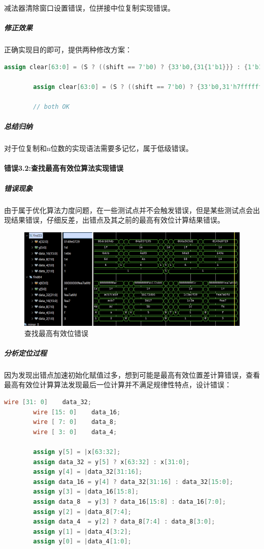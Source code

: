 \documentclass[UTF-8,twoside,c5size]{ctexart}
\begin{document}
	减法器清除窗口设置错误，位拼接中位复制实现错误。
	
	\subparagraph{修正效果}\hfill
	
	正确实现目的即可，提供两种修改方案：
	
	\begin{lstlisting}[language=verilog]
		assign clear[63:0] = (S ? ((shift == 7'b0) ? {33'b0,{31{1'b1}}} : {1'b1,33'b0,{30{1'b1}}} >>> (shift-1)) : {64{1'b1}});
		
		assign clear[63:0] = (S ? ((shift == 7'b0) ? {33'b0,31'h7fffffff} : {1'b1,33'b0,30'h3fffffff} >>> (shift-1)) : 64'hffffffff);
		
		// both OK
	\end{lstlisting}
	
	\subparagraph{总结归纳}\hfill
	
	对于位复制和n位数的实现语法需要多记忆，属于低级错误。
	
	\paragraph{错误\textbf{3.2:}查找最高有效位算法实现错误}
	
	\subparagraph{错误现象}\hfill
	
	由于属于优化算法力度问题，在一些测试点并不会触发错误，但是某些测试点会出现结果错误，仔细反差，出错点及其之前的最高有效位计算结果错误。
	
	\begin{figure}[h]
		\centering
		\includegraphics[width=0.85\linewidth]{figures/div_highest.png}
		\caption{查找最高有效位错误}
		\label{fig:divhighest}
	\end{figure}
	
	\subparagraph{分析定位过程}\hfill
	
	因为发现出错点加速初始化赋值过多，想到可能是最高有效位置差计算错误，查看最高有效位计算算法发现最后一位计算并不满足规律性特点，设计错误：
	
	\begin{lstlisting}[language=verilog]
		wire [31: 0]    data_32;
		wire [15: 0]    data_16;
		wire [ 7: 0]    data_8;
		wire [ 3: 0]    data_4;
		
		assign y[5] = |x[63:32];
		assign data_32 = y[5] ? x[63:32] : x[31:0];
		assign y[4] = |data_32[31:16];
		assign data_16 = y[4] ? data_32[31:16] : data_32[15:0];
		assign y[3] = |data_16[15:8];
		assign data_8  = y[3] ? data_16[15:8] : data_16[7:0];
		assign y[2] = |data_8[7:4];
		assign data_4  = y[2] ? data_8[7:4] : data_8[3:0];
		assign y[1] = |data_4[3:2];
		assign y[0] = |data_4[1:0];
	\end{lstlisting}
	
\end{document}
